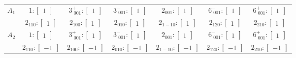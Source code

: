 \documentclass[fleqn,8pt,landscape]{jsarticle}
\begin{document}
\begin{longtable}{ccccccc}
$ A_{1} $ & $ 1:\begin{bmatrix} 1 \end{bmatrix} $ & $ 3^{+}_{\,\,001}:\begin{bmatrix} 1 \end{bmatrix} $ & $ 3^{-}_{\,\,001}:\begin{bmatrix} 1 \end{bmatrix} $ & $ 2{}_{001}:\begin{bmatrix} 1 \end{bmatrix} $ & $ 6^{-}_{\,\,001}:\begin{bmatrix} 1 \end{bmatrix} $ & $ 6^{+}_{\,\,001}:\begin{bmatrix} 1 \end{bmatrix} $ \\
& $ 2{}_{110}:\begin{bmatrix} 1 \end{bmatrix} $ & $ 2{}_{100}:\begin{bmatrix} 1 \end{bmatrix} $ & $ 2{}_{010}:\begin{bmatrix} 1 \end{bmatrix} $ & $ 2{}_{1-10}:\begin{bmatrix} 1 \end{bmatrix} $ & $ 2{}_{120}:\begin{bmatrix} 1 \end{bmatrix} $ & $ 2{}_{210}:\begin{bmatrix} 1 \end{bmatrix} $ \\ \hline
$ A_{2} $ & $ 1:\begin{bmatrix} 1 \end{bmatrix} $ & $ 3^{+}_{\,\,001}:\begin{bmatrix} 1 \end{bmatrix} $ & $ 3^{-}_{\,\,001}:\begin{bmatrix} 1 \end{bmatrix} $ & $ 2{}_{001}:\begin{bmatrix} 1 \end{bmatrix} $ & $ 6^{-}_{\,\,001}:\begin{bmatrix} 1 \end{bmatrix} $ & $ 6^{+}_{\,\,001}:\begin{bmatrix} 1 \end{bmatrix} $ \\
& $ 2{}_{110}:\begin{bmatrix} -1 \end{bmatrix} $ & $ 2{}_{100}:\begin{bmatrix} -1 \end{bmatrix} $ & $ 2{}_{010}:\begin{bmatrix} -1 \end{bmatrix} $ & $ 2{}_{1-10}:\begin{bmatrix} -1 \end{bmatrix} $ & $ 2{}_{120}:\begin{bmatrix} -1 \end{bmatrix} $ & $ 2{}_{210}:\begin{bmatrix} -1 \end{bmatrix} $ \\ \hline

\end{longtable}
\end{document}
